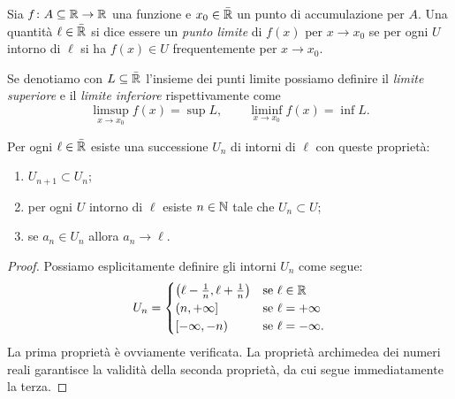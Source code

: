 \begin{definition}
  Sia $f\colon A\subseteq {\mathbb R} \to {\mathbb R}$ una funzione e $x_0\in \bar {{\mathbb R}}$ 
  un punto di accumulazione per $A$.
  Una quantità $\ell\in \bar{{\mathbb R}}$ si dice essere
  un \emph{punto limite}%
%
 di $f(x)$ per $x\to x_0$ se 
  per ogni $U$ intorno di $\ell$ si ha $f(x)\in U$ 
  frequentemente per $x\to x_0$.
  
  Se denotiamo con $L\subseteq \bar{{\mathbb R}}$ l'insieme
  dei punti limite possiamo definire il \emph{limite superiore} e il
  \emph{limite inferiore}
  rispettivamente come
  \[
  \limsup_{x\to x_0} f(x) = \sup L, \qquad
  \liminf_{x\to x_0} f(x) = \inf L.
  \]
\end{definition}
  
\begin{proposition}%
  \label{prop:base_numerabile}%
  Per ogni $\ell\in \bar {{\mathbb R}}$ esiste una successione $U_n$ di intorni di $\ell$ 
  con queste proprietà:
  \begin{enumerate}
    \item $U_{n+1}\subset U_n$;
    \item per ogni $U$ intorno di $\ell$ esiste $n\in {\mathbb N}$ tale che $U_n\subset U$;
    \item se $a_n\in U_n$ allora $a_n\to \ell$.
  \end{enumerate}
\end{proposition}
\begin{proof}
Possiamo esplicitamente definire gli intorni $U_n$ come segue:
\[
  U_n = 
  \begin{cases}
    \left(\ell-\frac 1 n,\ell+\frac 1 n\right) & \text{se $\ell\in {\mathbb R}$}\\ 
    \left(n,+\infty\right] & \text{se $\ell=+\infty$}\\
    \left[-\infty,-n\right) & \text{se $\ell=-\infty$.}
  \end{cases}
\]
La prima proprietà è ovviamente verificata.
La proprietà archimedea dei numeri reali garantisce la validità della seconda 
proprietà, da cui segue immediatamente la terza.
\end{proof}

